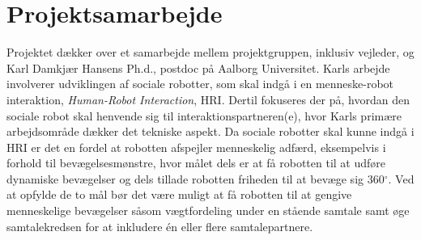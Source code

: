\section{Projektsamarbejde}
\label{ProjektSamarbejde}
%
Projektet dækker over et samarbejde mellem projektgruppen, inklusiv vejleder, og Karl Damkjær Hansens Ph.d., postdoc på Aalborg Universitet. Karls arbejde involverer udviklingen af sociale robotter, som skal indgå i en menneske-robot interaktion, \textit{Human-Robot Interaction}, HRI. Dertil fokuseres der på, hvordan den sociale robot skal henvende sig til interaktionspartneren(e), hvor Karls primære arbejdsområde dækker det tekniske aspekt. Da sociale robotter skal kunne indgå i HRI er det en fordel at robotten afspejler menneskelig adfærd, eksempelvis i forhold til bevægelsesmønstre, hvor målet dels er at få robotten til at udføre dynamiske bevægelser og dels tillade robotten friheden til at bevæge sig 360$^{\circ}$. Ved at opfylde de to mål bør det være muligt at få robotten til at gengive menneskelige bevægelser såsom vægtfordeling under en stående samtale samt øge samtalekredsen for at inkludere én eller flere samtalepartnere.

